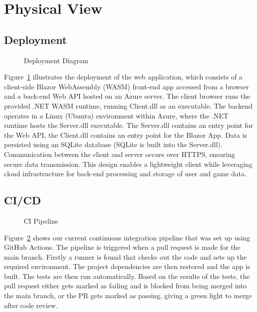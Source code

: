 \documentclass[11pt,a4paper]{article}
\newcommand{\inputdiagram}[1]{}
\newcommand{\textwidthdiagram}[2][1]{%
  \resizebox{#1\textwidth}{!}{\inputdiagram{#2}}%
}
\begin{document}
\section{Physical View}
\subsection{Deployment}
\begin{figure}[H]
    \centering
    \begin{adjustbox}{width=0.92\paperwidth,center}
        \inputdiagram{deployment_diagram.tex}
     \end{adjustbox}
    \caption{Deployment Diagram}
    \label{fig:deployment_diagram}
\end{figure}

Figure~\ref{fig:deployment_diagram} illustrates the deployment of the web
application, which consists of a client-side Blazor WebAssembly (WASM)
front-end app accessed from a browser and a back-end Web API hosted on
an Azure server. The client browser runs the provided .NET WASM runtime,
running Client.dll as an executable. The backend operates in a Linux (Ubuntu)
environment within Azure, where the .NET runtime hosts the Server.dll
executable. The Server.dll contains an entry point for the Web API, the
Client.dll contains an entry point for the Blazor App. Data is persisted using
an SQLite database (SQLite is built into the Server.dll). Communication
between the client and server occurs over HTTPS, ensuring secure data
transmission. This design enables a lightweight client while leveraging
cloud infrastructure for back-end processing and storage of user and game data.

\subsection{CI/CD}

\begin{figure}[H]
        \centering
        \textwidthdiagram[0.8]{CI.tex}
        \caption{CI Pipeline}
        \label{fig:CI_pipeline}
\end{figure}
Figure~\ref{fig:CI_pipeline} shows our current continuous integration pipeline that was set up using GitHub Actions. The pipeline is triggered when a pull request is made for the main branch. Firstly a runner is found that checks out the code and sets up the required environment. The project dependencies are then restored and the app is built. The tests are then run automatically. Based on the results of the tests, the pull request either gets marked as failing and is blocked from being merged into the main branch, or the PR gets marked as passing, giving a green light to merge after code review.
\end{document}
